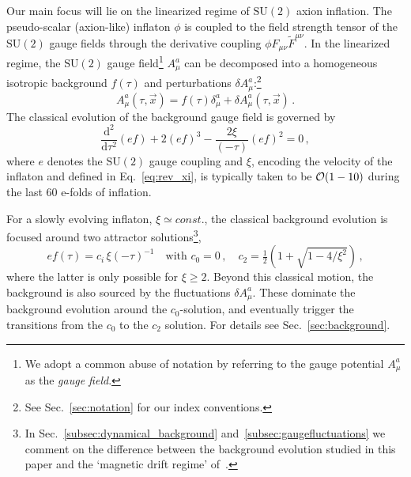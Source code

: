 Our main focus will lie on the linearized regime of $\mathrm{SU}(2)$ axion inflation. The pseudo-scalar (axion-like) inflaton $\phi$ is coupled to the field strength tensor of the $\mathrm{SU}(2)$ gauge fields through the derivative coupling $\phi F_{\mu \nu} \tilde F^{\mu \nu}$. In the linearized regime, the $\mathrm{SU}(2)$ gauge field\footnote{We adopt a common abuse of notation by referring to the gauge potential $A^a_\mu$ as the \emph{gauge field}.} $A_\mu^a$ can be decomposed into a homogeneous isotropic background $f(\tau)$ and perturbations $\delta A_\mu^a$:\footnote{See Sec.~\ref{sec:notation} for our index conventions.} 
\begin{equation}
 A_\mu^a(\tau, \vec x) = f(\tau) \delta^a_\mu + \delta A^a_\mu (\tau, \vec x) \,.
\end{equation}
The classical evolution of the background gauge field is governed by
\begin{equation}
 \frac{\textrm{d}^2}{\textrm{d} \tau^2}(e f) + 2 (e f)^3 - \frac{2 \xi}{(- \tau)} (e f)^2 = 0 \,,
\end{equation}
where $e$ denotes the $\mathrm{SU}(2)$ gauge coupling and $\xi$, encoding the velocity of the inflaton and defined in Eq.~\eqref{eq:rev_xi}, is typically taken to be ${\cal O}(1 - 10)$ during the last 60 e-folds of inflation. 

For a slowly evolving inflaton, $\xi \simeq const.$, the classical background evolution is focused around two attractor solutions\footnote{In Sec.~\ref{subsec:dynamical_background} and~\ref{subsec:gaugefluctuations} we comment on the difference between the background evolution studied in this paper and the ‘magnetic drift regime’ of~\cite{Adshead:2012kp,Dimastrogiovanni:2012ew, Adshead:2013qp,  Adshead:2013nka}.},
\begin{equation}
 e f(\tau) = c_i \, \xi (- \tau)^{-1} \quad \text{with  } c_0 = 0 \,, \quad c_2 = \tfrac{1}{2} (1 + \sqrt{1 - 4/\xi^2}) \,,
\end{equation}
where the latter is only possible for $\xi \geq 2$. 
Beyond this classical motion, the background is also sourced by the fluctuations $\delta A^a_\mu$. These dominate the background evolution around the $c_0$-solution, and eventually trigger the transitions from the $c_0$ to the $c_2$ solution. For details see Sec.~\ref{sec:background}.

